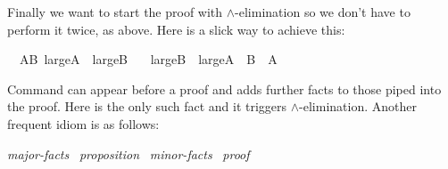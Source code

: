 \begin{isabellebody}
\begin{isamarkuptext}
Finally we want to start the proof with $\land$-elimination so we
don't have to perform it twice, as above. Here is a slick way to
achieve this:%
\end{isamarkuptext}%
\isamarkuptrue%
\ \ AB{\isacharcolon}\ {\isachardoublequote}large{\isacharunderscore}A\ {\isasymand}\ large{\isacharunderscore}B{\isachardoublequote}\isanewline
\ \ \ {\isachardoublequote}large{\isacharunderscore}B\ {\isasymand}\ large{\isacharunderscore}A{\isachardoublequote}\ {\isacharparenleft}\ {\isachardoublequote}{\isacharquery}B\ {\isasymand}\ {\isacharquery}A{\isachardoublequote}{\isacharparenright}\isanewline
\isamarkupfalse%
\isamarkupfalse%
\isamarkupfalse%
\isamarkupfalse%
\isamarkupfalse%
\isamarkupfalse%
\isamarkupfalse%
%
\begin{isamarkuptext}%
\noindent Command  can appear before a proof
and adds further facts to those piped into the proof. Here 
is the only such fact and it triggers $\land$-elimination. Another
frequent idiom is as follows:
\begin{center}
 \emph{major-facts}~
 \emph{proposition}~
 \emph{minor-facts}~
\emph{proof}
\end{center}


\end{isamarkuptext}
\end{isabellebody}
